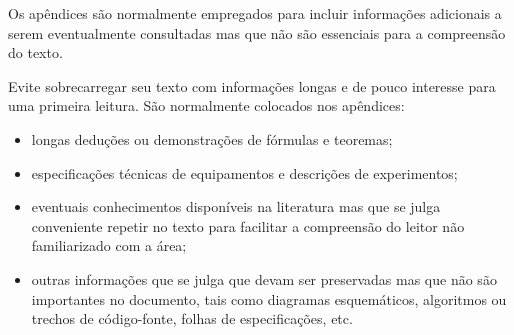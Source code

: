 
\label{Cap:apendice}

Os apêndices são normalmente empregados para incluir informações
adicionais a serem eventualmente consultadas mas que não são
essenciais para a compreensão do texto.

Evite sobrecarregar seu texto com informações longas e de pouco
interesse para uma primeira leitura. São normalmente colocados
nos apêndices:
\begin{itemize}
\item longas deduções ou demonstrações de fórmulas e teoremas;
\item especificações técnicas de equipamentos e descrições de
experimentos;
\item eventuais conhecimentos disponíveis na literatura mas que
se julga conveniente repetir no texto para facilitar a compreensão
do leitor não familiarizado com a área;
\item outras informações que se julga que devam ser preservadas
mas que não são importantes no documento, tais como diagramas
esquemáticos, algoritmos ou trechos de código-fonte, folhas de
especificações, etc.
\end{itemize}
